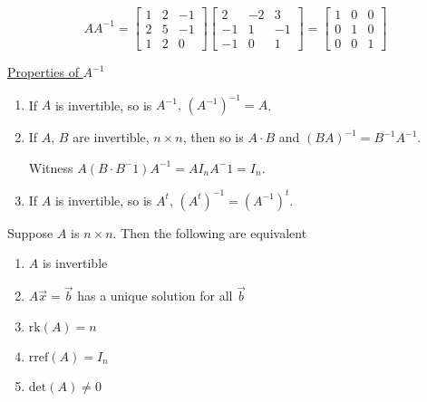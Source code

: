 \documentclass[../main.tex]{subfiles}
\begin{document}
\begin{example}[]
    \[ AA^{-1} =
        \begin{bmatrix}
            1 & 2 & -1 \\
            2 & 5 & -1 \\
            1 & 2 & 0
        \end{bmatrix}
        \begin{bmatrix}
            2 & -2 & 3 \\
            -1 & 1 & -1 \\
            -1 & 0 & 1
        \end{bmatrix}
        = \begin{bmatrix}
            1 & 0 & 0 \\
            0 & 1 & 0 \\
            0 & 0 & 1
        \end{bmatrix}
    \]
\end{example}

\underline{Properties of \( A^{-1} \)}
\begin{enumerate}
    \item If \( A \) is invertible, so is \( A^{-1}, \, \left( A^{-1} \right)^{-1} = A \).
    \item If \( A, \, B \) are invertible, \( n \times n \), then so is \( A \cdot B \) and \( (BA)^{-1} = B^{-1}A^{-1} \).

        Witness \( A \left( B \cdot B^-1 \right)A^{-1} = A I_n A^-1 = I_n \).
    \item If \( A \) is invertible, so is \( A^t, \, \left( A^t \right)^{-1} = \left( A^{-1} \right)^t \).
\end{enumerate}

\begin{theorem}[]
    Suppose \( A \) is \( n \times n \).
    Then the following are equivalent
    \begin{enumerate}
        \item \( A \) is invertible
        \item \( A \vec{x} = \vec{b} \) has a unique solution for all \( \vec{b} \)
        \item \( \text{rk}(A) = n \)
        \item \( \text{rref}(A) = I_n \)
        \item \( \text{det}(A) \neq 0 \)
    \end{enumerate}
\end{theorem}

\end{document}
